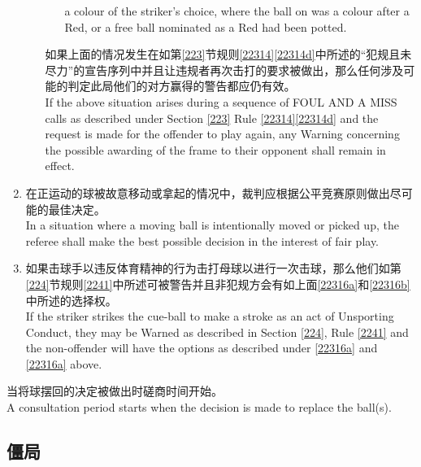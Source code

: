 \begin{enumerate}[label=(\alph*)]
\begin{enumerate}[label=(\roman*)]
\begin{enumerate}[label=(\roman*)]
            a colour of the striker's choice, where the ball on was a colour after a Red, or a free ball nominated as a Red had been potted.
        \end{enumerate}
        如果上面的情况发生在如第\ref{223}节规则\ref{22314}\ref{22314d}中所述的``犯规且未尽力''的宣告序列中并且让违规者再次击打的要求被做出，那么任何涉及可能的判定此局他们的对方赢得的警告都应仍有效。\\
        If the above situation arises during a sequence of FOUL AND A MISS calls as described under Section \ref{223} Rule \ref{22314}\ref{22314d} and the request is made for the offender to play again, any Warning concerning the possible awarding of the frame to their opponent shall remain in effect.
    \end{enumerate}
    \item \label{22316b}在正运动的球被故意移动或拿起的情况中，裁判应根据公平竞赛原则做出尽可能的最佳决定。\\
    In a situation where a moving ball is intentionally moved or picked up, the referee shall make the best possible decision in the interest of fair play.
    \item 如果击球手以违反体育精神的行为击打母球以进行一次击球，那么他们如第\ref{224}节规则\ref{2241}中所述可被警告并且非犯规方会有如上面\ref{22316a}和\ref{22316b}中所述的选择权。\\
    If the striker strikes the cue-ball to make a stroke as an act of Unsporting Conduct, they may be Warned as described in Section \ref{224}, Rule \ref{2241} and the non-offender will have the options as described under \ref{22316a} and \ref{22316a} above.
\end{enumerate}
\noindent 当将球摆回的决定被做出时磋商时间开始。\\
A consultation period starts when the decision is made to replace the ball(s).

\subsection{僵局}\label{22317}

